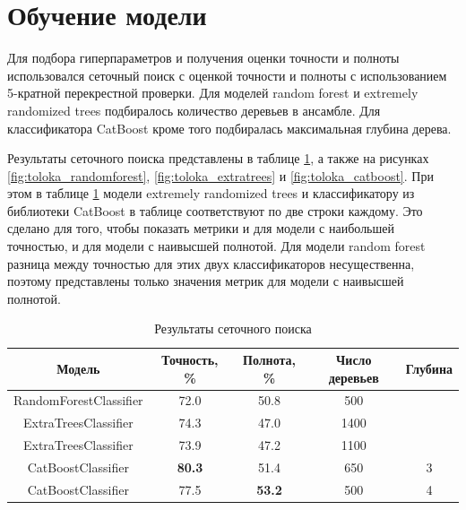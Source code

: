 \section{Обучение модели}

Для подбора гиперпараметров и получения оценки точности и полноты использовался сеточный поиск с оценкой точности и полноты с использованием 5-кратной перекрестной проверки. Для моделей random forest и extremely randomized trees подбиралось количество деревьев в ансамбле. Для классификатора CatBoost кроме того подбиралась максимальная глубина дерева.

Результаты сеточного поиска представлены в таблице \ref{tab:toloka_grid_search}, а также на рисунках \ref{fig:toloka_randomforest}, \ref{fig:toloka_extratrees} и \ref{fig:toloka_catboost}. При этом в таблице \ref{tab:toloka_grid_search} модели extremely randomized trees и классификатору из библиотеки CatBoost в таблице соответствуют по две строки каждому. Это сделано для того, чтобы показать метрики и для модели с наибольшей точностью, и для модели с наивысшей полнотой. Для модели random forest разница между точностью для этих двух классификаторов несущественна, поэтому представлены только значения метрик для модели с наивысшей полнотой.

\begin{table}[h]
    \centering
    \begin{tabular}{|c|c|c|c|c|}
        \hline
        Модель & Точность, \% & Полнота, \% & Число деревьев & Глубина \\
        \hline
        RandomForestClassifier & 72.0 & 50.8 & 500 & \\
        \hline
        ExtraTreesClassifier & 74.3 & 47.0 & 1400 & \\
        \hline
        ExtraTreesClassifier & 73.9 & 47.2 & 1100 & \\
        \hline
        CatBoostClassifier & \textbf{80.3} & 51.4 & 650 & 3 \\
        \hline
        CatBoostClassifier & 77.5 & \textbf{53.2} & 500 & 4 \\
        \hline
    \end{tabular}
    \caption{Результаты сеточного поиска}
    \label{tab:toloka_grid_search}
\end{table}

